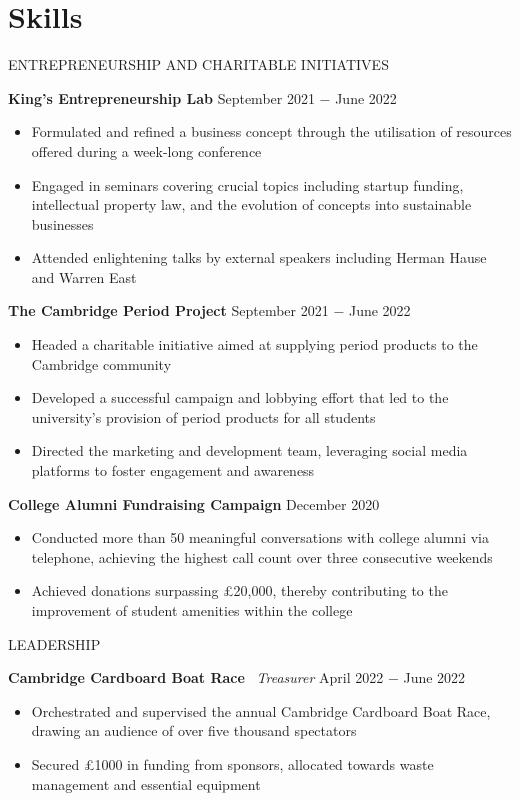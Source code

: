 \documentclass{article}
\begin{document}
\clearpage
\section*{Skills}

\uppercase{Entrepreneurship and Charitable Initiatives}

\textbf{King's Entrepreneurship Lab} \hfill September 2021 $-$ June 2022
\begin{itemize}
    \item Formulated and refined a business concept through the utilisation of resources offered during a week-long conference
    \item Engaged in seminars covering crucial topics including startup funding, intellectual property law, and the evolution of concepts into sustainable businesses
    \item Attended enlightening talks by external speakers including Herman Hause and Warren East
\end{itemize} \medskip

\textbf{The Cambridge Period Project} \hfill September 2021 $-$ June 2022
\begin{itemize}
    \item Headed a charitable initiative aimed at supplying period products to the Cambridge community
    \item Developed a successful campaign and lobbying effort that led to the university's provision of period products for all students
    \item Directed the marketing and development team, leveraging social media platforms to foster engagement and awareness
\end{itemize}\medskip

\textbf{College Alumni Fundraising Campaign} \hfill December 2020
\begin{itemize}
    \item Conducted more than 50 meaningful conversations with college alumni via telephone, achieving the highest call count over three consecutive weekends
    \item Achieved donations surpassing £20,000, thereby contributing to the improvement of student amenities within the college
\end{itemize} \medskip

\uppercase{Leadership}

\textbf{Cambridge Cardboard Boat Race} \
\textit{Treasurer} \hfill April 2022 $-$ June 2022
\begin{itemize}
    \item Orchestrated and supervised the annual Cambridge Cardboard Boat Race, drawing an audience of over five thousand spectators
    \item Secured £1000 in funding from sponsors, allocated towards waste management and essential equipment
\end{itemize} \medskip
\end{document}
